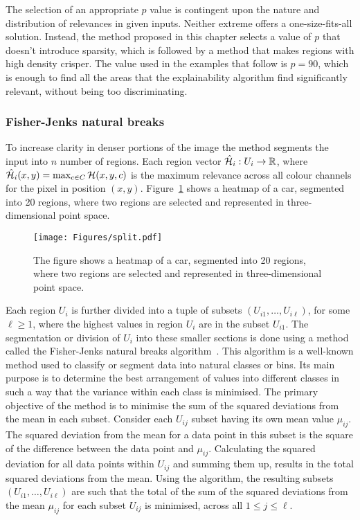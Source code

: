 The selection of an appropriate $p$ value is contingent upon the nature and distribution of relevances in given inputs. Neither extreme offers a one-size-fits-all solution. Instead, the method proposed in this chapter selects a value of $p$ that doesn't introduce sparsity, which is followed by a method that makes regions with high density crisper. The value used in the examples that follow is $p=90$, which is enough to find all the areas that the explainability algorithm find significantly relevant, without being too discriminating.

\subsubsection{Fisher-Jenks natural breaks}
To increase clarity in denser portions of the image the method segments the input into $n$ number of regions. Each region vector $\hat{\mathcal{H}}_i:U_i \to \mathbb{R}$, where $\hat{\mathcal{H}}_i(x,y) = \max_{c\in C} \mathcal{H}(x,y,c)$ is the maximum relevance across all colour channels for the pixel in position $(x,y)$. Figure~\ref{Fig:segment} shows a heatmap of a car, segmented into 20 regions, where two regions are selected and represented in three-dimensional point space.

\begin{figure}[ht!]
	\begin{center}
\texttt{[image: Figures/split.pdf]}
\end{center}
\caption{The figure shows a heatmap of a car, segmented into 20 regions, where two regions are selected and represented in three-dimensional point space.}
\label{Fig:segment}
\end{figure} 

Each region $U_i$ is further divided into a tuple of subsets $(U_{i1},\dots, U_{i\ell})$, for some $\ell\geq 1$, where the highest values in region $U_i$ are in the subset $U_{i1}$. The segmentation or division of $U_i$ into these smaller sections is done using a method called the Fisher-Jenks natural breaks algorithm~\cite{fisher1958grouping}. This algorithm is a well-known method used to classify or segment data into natural classes or bins. Its main purpose is to determine the best arrangement of values into different classes in such a way that the variance within each class is minimised. The primary objective of the method is to minimise the sum of the squared deviations from the mean in each subset. Consider each $U_{ij}$ subset having its own mean value $\mu_{ij}$. The squared deviation from the mean for a data point in this subset is the square of the difference between the data point and $\mu_{ij}$. Calculating the squared deviation for all data points within $U_{ij}$ and summing them up, results in the total squared deviations from the mean. Using the algorithm, the resulting subsets $(U_{i1},\dots, U_{i\ell})$ are such that the total of the sum of the squared deviations from the mean $\mu_{ij}$ for each subset $U_{ij}$ is minimised, across all $1\leq j\leq \ell$.

